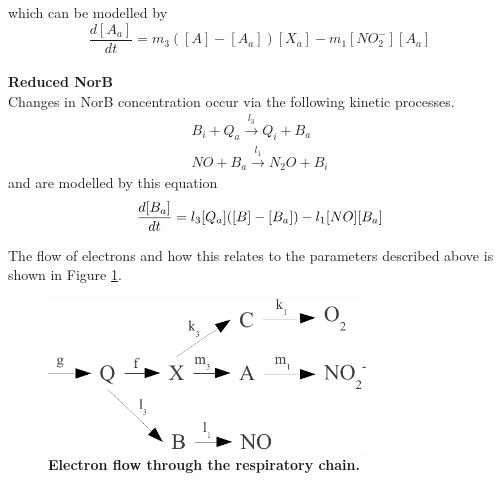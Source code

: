 which can be modelled by
\begin{equation}
\frac{d[A_a]}{dt} = m_3([A] - [A_a])[X_a]- m_{1}[NO_2^-][A_a]
\label{eq:active_ania}
\end{equation}\\
{\bf Reduced NorB}\\
Changes in NorB concentration occur via the following kinetic processes.
\begin{equation*}
\begin{gathered}
B_i + Q_a \xrightarrow{l_3} Q_i + B_a \\
NO + B_a \xrightarrow{l_1} N_{2}O + B_i
\end{gathered}
\end{equation*}
and are modelled by this equation
\begin{equation}
\frac{d[B_a]}{dt} = l_3[Q_a]([B] - [B_a]) - l_1[NO][B_a]\\
\label{eq:active_norb}
\end{equation}

The flow of electrons and how this relates to the parameters described above is shown in Figure \ref{fig:electron_flow}.

\begin{figure}[!ht]
 \centering
 \includegraphics[height=4cm]{./03-parameterestimationmethodologies/data/electron_flow.pdf}
 \caption[Electron flow through the respiratory chain]{{\bf Electron flow through the respiratory chain.}
 \label{fig:electron_flow}}
\end{figure}



